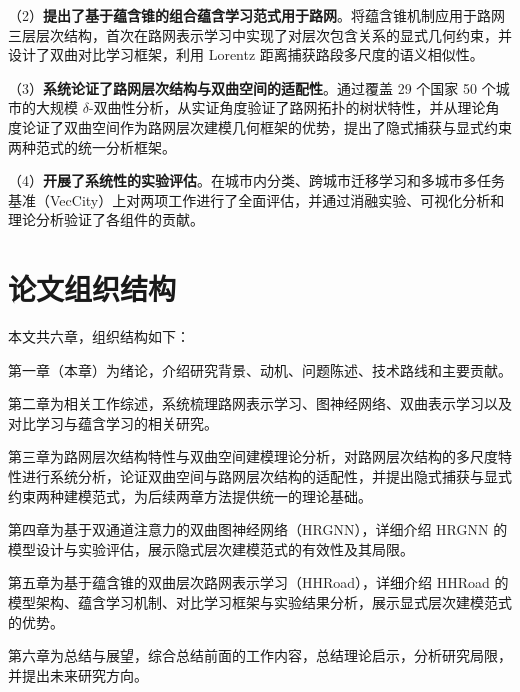 （2）\textbf{提出了基于蕴含锥的组合蕴含学习范式用于路网}。将蕴含锥机制应用于路网三层层次结构，首次在路网表示学习中实现了对层次包含关系的显式几何约束，并设计了双曲对比学习框架，利用 Lorentz 距离捕获路段多尺度的语义相似性。

（3）\textbf{系统论证了路网层次结构与双曲空间的适配性}。通过覆盖 29 个国家 50 个城市的大规模 $\delta$-双曲性分析，从实证角度验证了路网拓扑的树状特性，并从理论角度论证了双曲空间作为路网层次建模几何框架的优势，提出了隐式捕获与显式约束两种范式的统一分析框架。

（4）\textbf{开展了系统性的实验评估}。在城市内分类、跨城市迁移学习和多城市多任务基准（VecCity）上对两项工作进行了全面评估，并通过消融实验、可视化分析和理论分析验证了各组件的贡献。

\section{论文组织结构}

本文共六章，组织结构如下：

第一章（本章）为绪论，介绍研究背景、动机、问题陈述、技术路线和主要贡献。

第二章为相关工作综述，系统梳理路网表示学习、图神经网络、双曲表示学习以及对比学习与蕴含学习的相关研究。

第三章为路网层次结构特性与双曲空间建模理论分析，对路网层次结构的多尺度特性进行系统分析，论证双曲空间与路网层次结构的适配性，并提出隐式捕获与显式约束两种建模范式，为后续两章方法提供统一的理论基础。

第四章为基于双通道注意力的双曲图神经网络（HRGNN），详细介绍 HRGNN 的模型设计与实验评估，展示隐式层次建模范式的有效性及其局限。

第五章为基于蕴含锥的双曲层次路网表示学习（HHRoad），详细介绍 HHRoad 的模型架构、蕴含学习机制、对比学习框架与实验结果分析，展示显式层次建模范式的优势。

第六章为总结与展望，综合总结前面的工作内容，总结理论启示，分析研究局限，并提出未来研究方向。